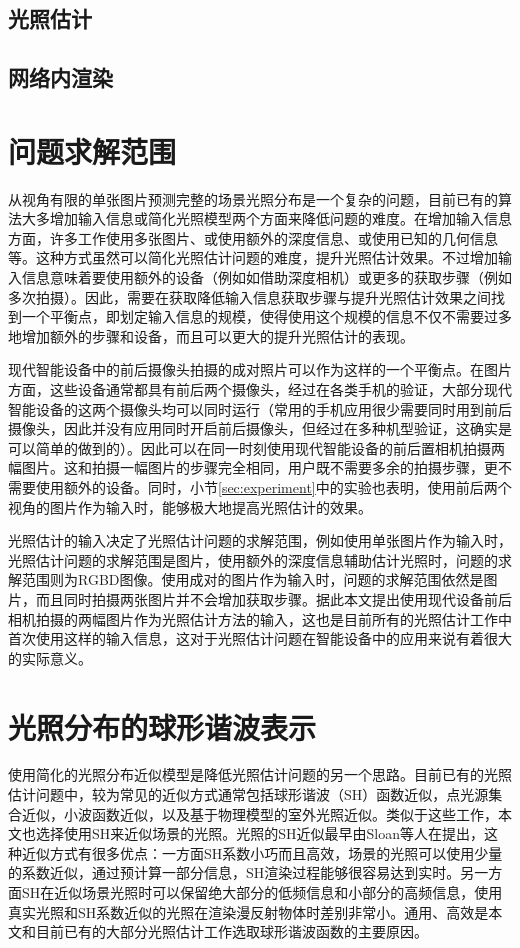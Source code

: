 \subsection{光照估计}
\subsection{网络内渲染}
\section{问题求解范围}
从视角有限的单张图片预测完整的场景光照分布是一个复杂的问题，目前已有的算法大多增加输入信息或简化光照模型两个方面来降低问题的难度。在增加输入信息方面，许多工作使用多张图片、或使用额外的深度信息、或使用已知的几何信息等。这种方式虽然可以简化光照估计问题的难度，提升光照估计效果。不过增加输入信息意味着要使用额外的设备（例如如借助深度相机）或更多的获取步骤（例如多次拍摄）。因此，需要在获取降低输入信息获取步骤与提升光照估计效果之间找到一个平衡点，即划定输入信息的规模，使得使用这个规模的信息不仅不需要过多地增加额外的步骤和设备，而且可以更大的提升光照估计的表现。

现代智能设备中的前后摄像头拍摄的成对照片可以作为这样的一个平衡点。在图片方面，这些设备通常都具有前后两个摄像头，经过在各类手机的验证，大部分现代智能设备的这两个摄像头均可以同时运行（常用的手机应用很少需要同时用到前后摄像头，因此并没有应用同时开启前后摄像头，但经过在多种机型验证，这确实是可以简单的做到的）。因此可以在同一时刻使用现代智能设备的前后置相机拍摄两幅图片。这和拍摄一幅图片的步骤完全相同，用户既不需要多余的拍摄步骤，更不需要使用额外的设备。同时，小节\ref{sec:experiment}中的实验也表明，使用前后两个视角的图片作为输入时，能够极大地提高光照估计的效果。

光照估计的输入决定了光照估计问题的求解范围，例如使用单张图片作为输入时，光照估计问题的求解范围是图片，使用额外的深度信息辅助估计光照时，问题的求解范围则为RGBD图像。使用成对的图片作为输入时，问题的求解范围依然是图片，而且同时拍摄两张图片并不会增加获取步骤。据此本文提出使用现代设备前后相机拍摄的两幅图片作为光照估计方法的输入，这也是目前所有的光照估计工作中首次使用这样的输入信息，这对于光照估计问题在智能设备中的应用来说有着很大的实际意义。

\section{光照分布的球形谐波表示}
使用简化的光照分布近似模型是降低光照估计问题的另一个思路。目前已有的光照估计问题中，较为常见的近似方式通常包括球形谐波（SH）函数近似，点光源集合近似，小波函数近似，以及基于物理模型的室外光照近似。类似于这些工作，本文也选择使用SH来近似场景的光照。光照的SH近似最早由Sloan等人在\cite{sloan2002precomputed}提出，这种近似方式有很多优点：一方面SH系数小巧而且高效，场景的光照可以使用少量的系数近似，通过预计算一部分信息，SH渲染过程能够很容易达到实时。另一方面SH在近似场景光照时可以保留绝大部分的低频信息和小部分的高频信息，使用真实光照和SH系数近似的光照在渲染漫反射物体时差别非常小。通用、高效是本文和目前已有的大部分光照估计工作选取球形谐波函数的主要原因。

